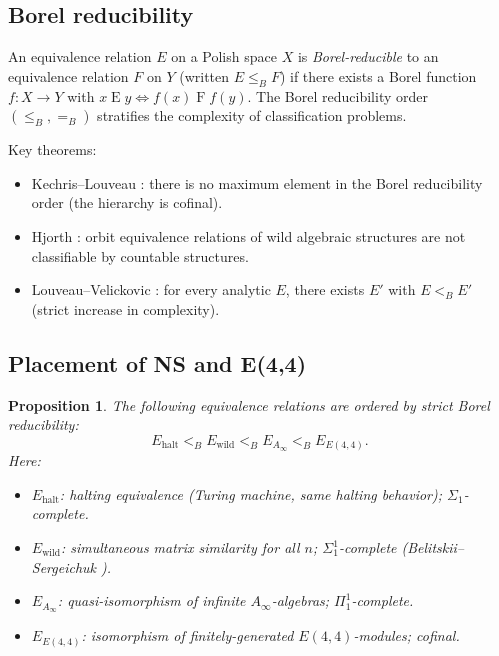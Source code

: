 \documentclass[reqno,10pt]{amsart}
\theoremstyle{plain}
\newtheorem{proposition}[theorem]{Proposition}
\theoremstyle{definition}
\def\gE{E(4,4)}
\begin{document}
\subsection{Borel reducibility}

An equivalence relation $E$ on a Polish space $X$ is \emph{Borel-reducible}
to an equivalence relation $F$ on $Y$ (written $E \leq_B F$) if there
exists a Borel function $f: X \to Y$ with $x \mathrel{E} y \iff f(x) \mathrel{F} f(y)$.
The Borel reducibility order $(\leq_B, =_B)$ stratifies the complexity of
classification problems.

Key theorems:
\begin{itemize}
  \item Kechris--Louveau \cite{KL1997}: there is no maximum element in the
        Borel reducibility order (the hierarchy is cofinal).
  \item Hjorth \cite{Hjorth2000}: orbit equivalence relations of wild
        algebraic structures are not classifiable by countable structures.
  \item Louveau--Velickovic \cite{LV1994}: for every analytic $E$, there
        exists $E'$ with $E <_B E'$ (strict increase in complexity).
\end{itemize}

\subsection{Placement of NS and E(4,4)}

\begin{proposition}
  The following equivalence relations are ordered by strict Borel reducibility:
  \[
    E_{\mathrm{halt}} <_B E_{\mathrm{wild}} <_B E_{A_\infty} <_B E_{\gE}.
  \]
  Here:
  \begin{itemize}
    \item $E_{\mathrm{halt}}$: halting equivalence (Turing machine, same halting
          behavior); $\Sigma_1$-complete.
    \item $E_{\mathrm{wild}}$: simultaneous matrix similarity for all $n$;
          $\Sigma_1^1$-complete (Belitskii--Sergeichuk \cite{BS2000}).
    \item $E_{A_\infty}$: quasi-isomorphism of infinite $A_\infty$-algebras;
          $\Pi_1^1$-complete.
    \item $E_{\gE}$: isomorphism of finitely-generated $\gE$-modules;
          cofinal.
  \end{itemize}
\end{proposition}
\end{document}
